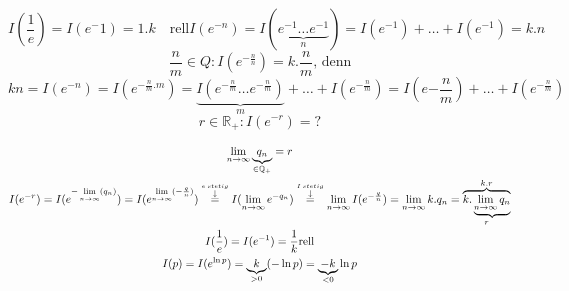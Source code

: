  
 \begin{equation}
 	I(\frac{1}{e})= I(e^-1)= 1.k   \quad \text{rell}
 		I(e^{-n})= I(\underbrace{e^{-1} \dots e^{-1}}_n )= I (e^{-1})+\dots+ I(e^{-1})= k.n 
 		\end{equation}
 		 \begin{equation}
 		\frac{n}{m} \in Q : I ( e^{-\frac{n}{n}})= k. \frac{n}{m}\text{, denn}
 		\end{equation}
 		\begin{equation}
 		kn=I(e^{-n}) = I(e^{-\frac{n}{m} . m})= \underbrace{I ( e^{-\frac{n}{m}} \dots  e^{-\frac{n}{m}} )}_{m}+\dots + I (e^{-\frac{n}{m}})= I(e{-\frac{n}{m}})+ \dots + I(e^{-\frac{n}{m}}) 
 		\end{equation}
 		\begin{equation}
 		r \in \mathbb{R}_+ : I(e^{-r})=?
  		\end{equation}

\begin{gather*}
	\lim\limits_{n \rightarrow \infty} \underbrace{q_n}_{\in \mathbb{Q_+}}= r \\
	I(e^{-r})= I(e^{-\lim\limits_{n \rightarrow \infty} (q_n)})
	= I (e^{\lim\limits_{n \rightarrow \infty} (-\frac{q}{n})})
		\overset{\overset{e \: stetig}{\downarrow}}{=} I(\lim\limits_{n \rightarrow \infty} e^{-q_n})	\overset{\overset{I \: stetig}{\downarrow}}{=} \lim\limits_{n \rightarrow \infty} I(e^{-\frac{q}{n}})	
	= \lim\limits_{n \rightarrow \infty} k.q_n
	=\overbrace{k.\underbrace{\lim\limits_{n \rightarrow \infty} q_n}}_{r}^{k.r}\\
	I(\frac{1}{e})= I(e^{-1})= \frac{1}{k} \text{rell} \\
	I(p)=I(e^{\ln p}) = \underbrace{k}_{>0}(- \ln p) =\underbrace{-k}_{<0} \ln p
\end{gather*}


